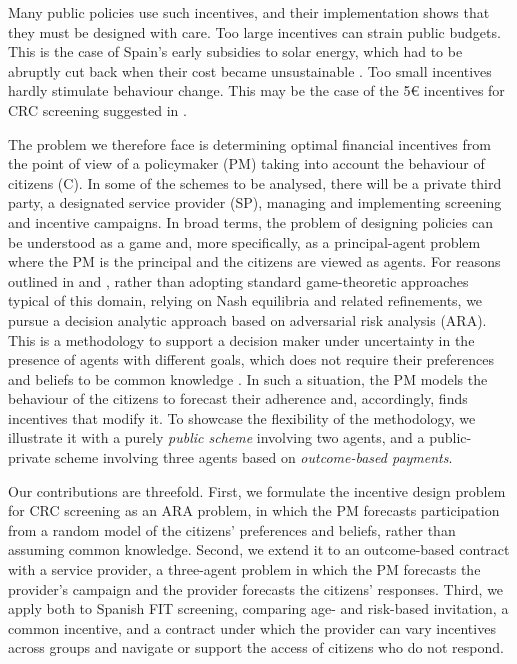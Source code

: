 \documentclass[12pt]{article}
\begin{document}
Many public policies use such incentives, and their implementation shows that they must be designed with care. Too large incentives can strain public budgets. This is the case of Spain's early subsidies to solar energy, which had to be abruptly cut back when their cost became unsustainable \citep{del2012support}. Too small incentives hardly stimulate behaviour change. This may be the case of the 5€ incentives for CRC screening suggested in \cite{facciorusso2021addition}.

The problem we therefore face is determining optimal financial incentives from the point of view of a policymaker (PM) taking into account the behaviour of citizens (C).  In some of the schemes to be analysed, there will be a private third party, a designated service provider (SP), managing and implementing screening and incentive campaigns. In broad terms, the problem of designing policies can be understood as a game and, more specifically, as a principal-agent problem \citep{smith1997principal} where the PM is the principal and the citizens are viewed as agents. For reasons outlined in \cite{rios2009adversarial} and \cite{ARAoverview}, rather than adopting standard game-theoretic approaches typical of this domain, relying on Nash equilibria and related refinements, we pursue a decision analytic approach based on adversarial risk analysis (ARA). This is a methodology to support a decision maker under uncertainty in the presence of agents with different goals, which does not require their preferences and beliefs to be common knowledge \citep{raiffa2007negotiation}. In such a situation, the PM models the behaviour of the citizens to forecast their adherence and, accordingly, finds incentives that modify it. To showcase the flexibility of the methodology, we illustrate it with a purely {\em public scheme} involving two agents, and a public-private scheme involving three agents based on {\em outcome-based payments}.

Our contributions are threefold. First, we formulate the incentive design problem for CRC screening as an ARA problem, in which the PM forecasts participation from a random model of the citizens' preferences and beliefs, rather than assuming common knowledge. Second, we extend it to an outcome-based contract with a service provider, a three-agent problem in which the PM forecasts the provider's campaign and the provider forecasts the citizens' responses. Third, we apply both to Spanish FIT screening, comparing age- and risk-based invitation, a common incentive, and a contract under which the provider can vary incentives across groups and navigate or support the access of citizens who do not respond.
\end{document}
